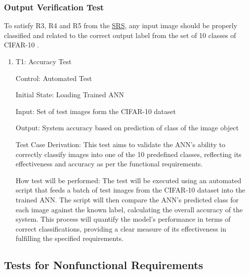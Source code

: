 \documentclass[12pt, titlepage]{article}
\begin{document}
\subsubsection{Output Verification Test}
To satisfy R3, R4 and R5 from the 
\href{https://github.com/tanya-jp/ANN-CAS741/blob/main/docs/SRS/SRS.pdf}{SRS}, any input image 
should be properly classified and related to the correct output label
from the set of 10 classes of CIFAR-10 \cite{CIFAR10}.

\begin{enumerate}

  \item{T1: Accuracy Test\\}

  Control: Automated Test
  
  Initial State: Loading Trained ANN
  
  Input: Set of test images form the CIFAR-10 dataset \cite{CIFAR10}
  
  Output: System accuracy based on prediction of class of the image object
  
  Test Case Derivation: This test aims to validate the ANN's ability to 
  correctly classify images into one of the 10 predefined classes, 
  reflecting its effectiveness and accuracy as per the functional requirements.

  How test will be performed: The test will be executed using an automated 
  script that feeds a batch of test images from the CIFAR-10 dataset \cite{CIFAR10} 
  into the trained ANN. 
  The script will then compare the ANN's predicted class for each image against 
  the known label, calculating the overall accuracy of the system. This process 
  will quantify the model's performance in terms of correct classifications, 
  providing a clear measure of its effectiveness in fulfilling the specified requirements.

\end{enumerate}

\subsection{Tests for Nonfunctional Requirements}

\end{document}
